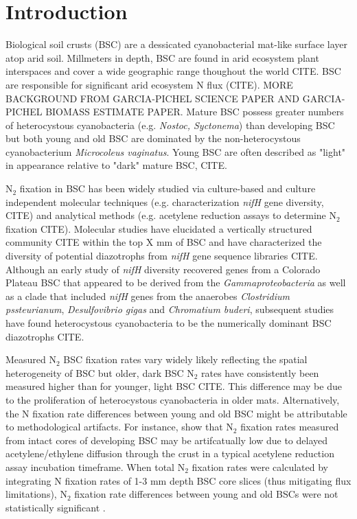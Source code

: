 \section{Introduction}


Biological soil crusts (BSC) are a dessicated cyanobacterial mat-like surface layer atop arid soil. Millmeters in depth, BSC are found in arid ecosystem plant interspaces and cover a wide geographic range thoughout the world CITE. BSC are responsible for significant arid ecosystem N flux (CITE). MORE BACKGROUND FROM GARCIA-PICHEL SCIENCE PAPER AND GARCIA-PICHEL BIOMASS ESTIMATE PAPER. Mature BSC possess greater numbers of heterocystous cyanobacteria (e.g. \textit{Nostoc, Syctonema}) than developing BSC but both young and old BSC are dominated by the non-heterocystous cyanobacterium \textit{Microcoleus vaginatus}. Young BSC are often described as "light" in appearance relative to "dark" mature BSC, CITE.

N$_{2}$ fixation in BSC has been widely studied via culture-based and culture independent molecular techniques (e.g. characterization \textit{nifH} gene diversity, CITE) and analytical methods (e.g. acetylene reduction assays to determine N$_{2}$ fixation CITE). Molecular studies have elucidated a vertically structured community CITE within the top X mm of BSC and have characterized the diversity of potential diazotrophs from \textit{nifH} gene sequence libraries CITE. Although an early study of \textit{nifH} diversity recovered genes from a Colorado Plateau BSC that appeared to be derived from the \textit{Gammaproteobacteria} as well as a clade that included \textit{nifH} genes from the anaerobes \textit{Clostridium pssteurianum}, \textit{Desulfovibrio gigas} and \textit{Chromatium buderi}, subsequent studies have found heterocystous cyanobacteria to be the numerically dominant BSC diazotrophs CITE. 

Measured N$_{2}$ BSC fixation rates vary widely likely reflecting the spatial heterogeneity of BSC but older, dark BSC N$_{2}$ rates have consistently been measured higher than for younger, light BSC CITE. This difference may be due to the proliferation of heterocystous cyanobacteria in older mats. Alternatively, the N fixation rate differences between young and old BSC might be attributable to methodological artifacts. For instance, \citet{15643930} show that N$_{2}$ fixation rates measured from intact cores of developing BSC may be artifcatually low due to delayed acetylene/ethylene diffusion through the crust in a typical acetylene reduction assay incubation timeframe. When total N$_{2}$ fixation rates were calculated by integrating N fixation rates of 1-3 mm depth BSC core slices (thus mitigating flux limitations), N$_{2}$ fixation rate differences between young and old BSCs were not statistically significant \cite{15643930}.

